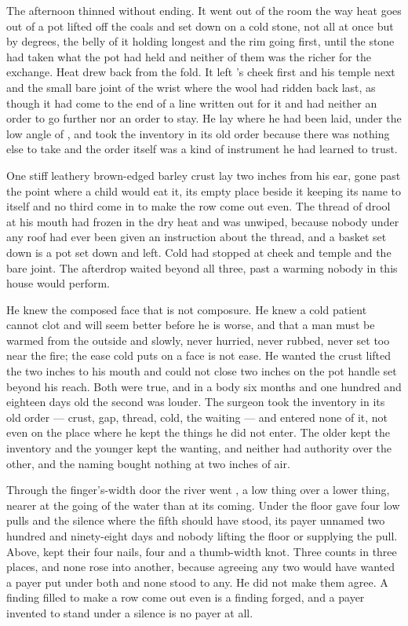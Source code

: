 The afternoon thinned without ending. It went out of the room the way heat goes out of a pot lifted off the coals and set down on a cold stone, not all at once but by degrees, the belly of it holding longest and the rim going first, until the stone had taken what the pot had held and neither of them was the richer for the exchange. Heat drew back from the fold. It left 's cheek first and his temple next and the small bare joint of the wrist where the wool had ridden back last, as though it had come to the end of a line written out for it and had neither an order to go further nor an order to stay. He lay where he had been laid, under the low angle of , and took the inventory in its old order because there was nothing else to take and the order itself was a kind of instrument he had learned to trust.

One stiff leathery brown-edged barley crust lay two inches from his ear, gone past the point where a child would eat it, its empty place beside it keeping its name to itself and no third come in to make the row come out even. The thread of drool at his mouth had frozen in the dry heat and was unwiped, because nobody under any roof had ever been given an instruction about the thread, and a basket set down is a pot set down and left. Cold had stopped at cheek and temple and the bare joint. The afterdrop waited beyond all three, past a warming nobody in this house would perform.

He knew the composed face that is not composure. He knew a cold patient cannot clot and will seem better before he is worse, and that a man must be warmed from the outside and slowly, never hurried, never rubbed, never set too near the fire; the ease cold puts on a face is not ease. He wanted the crust lifted the two inches to his mouth and could not close two inches on the pot handle set beyond his reach. Both were true, and in a body six months and one hundred and eighteen days old the second was louder. The surgeon took the inventory in its old order --- crust, gap, thread, cold, the waiting --- and entered none of it, not even on the place where he kept the things he did not enter. The older kept the inventory and the younger kept the wanting, and neither had authority over the other, and the naming bought nothing at two inches of air.

Through the finger's-width door the river went , a low thing over a lower thing, nearer at the going of the water than at its coming. Under the floor  gave four low pulls and the silence where the fifth should have stood, its payer unnamed two hundred and ninety-eight days and nobody lifting the floor or supplying the pull. Above,  kept their four nails, four and a thumb-width knot. Three counts in three places, and none rose into another, because agreeing any two would have wanted a payer put under both and none stood to any. He did not make them agree. A finding filled to make a row come out even is a finding forged, and a payer invented to stand under a silence is no payer at all.

